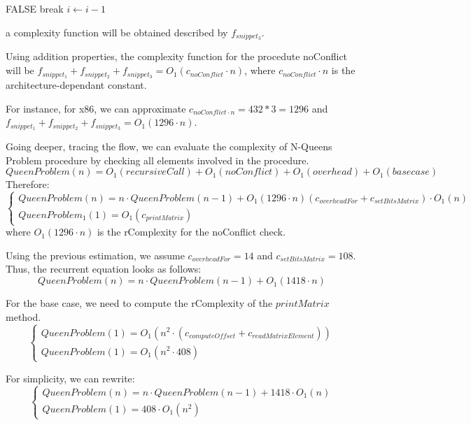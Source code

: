 \begin{algorithmic}[1]
    \State \Return FALSE
    \EndIf
    \State break
    \EndIf
    \State $i \gets i-1$
    \EndFor
\end{algorithmic}
a complexity function will be obtained described by $f_{snippet_{3}}$.

Using addition properties, the complexity function for the procedute noConflict will be $f_{snippet_{1}} + f_{snippet_{2}} + f_{snippet_{3}} = O_{1}(c_{noConflict} \cdot n)$, where $c_{noConflict} \cdot n$ is the architecture-dependant constant.

For instance, for x86, we can approximate $c_{noConflict \cdot n} = 432 * 3 = 1296$ and $f_{snippet_{1}} + f_{snippet_{2}} + f_{snippet_{3}} = O_{1}(1296 \cdot n) $.


Going deeper, tracing the flow, we can evaluate the complexity of N-Queens Problem procedure by checking all elements involved in the procedure.
\[QueenProblem(n) = O_{1}(recursiveCall) + O_{1}(noConflict) + O_{1}(overhead) + O_{1}(basecase) \]
Therefore:
\[\begin{cases}
      QueenProblem(n) = n \cdot QueenProblem(n-1) + O_{1}(1296 \cdot n) (c_{overheadFor} + c_{setBitsMatrix}) \cdot O_{1}(n) \\ QueenProblem_{1}(1)=O_{1}(c_{printMatrix})
\end{cases}\]
where $O_{1}(1296 \cdot n)$ is the rComplexity for the noConflict check.

Using the previous estimation, we assume $c_{overheadFor} = 14$ and $c_{setBitsMatrix} = 108$. Thus, the recurrent equation looks as follows:
\[QueenProblem(n) = n \cdot QueenProblem(n-1) + O_{1}(1418 \cdot n) \]

For the base case, we need to compute the rComplexity of the $printMatrix$ method.
\[ \begin{cases}
       QueenProblem(1)=O_{1}(n^{2} \cdot  (c_{computeOffset} + c_{readMatrixElement})) \\ QueenProblem(1)=O_{1}(n^{2} \cdot  408)
\end{cases}\]

For simplicity, we can rewrite:
\[ \begin{cases}
       QueenProblem(n) = n \cdot QueenProblem(n-1) + 1418 \cdot O_{1}(n) \\ QueenProblem(1)= 408 \cdot O_{1}(n^{2})
\end{cases}\]

